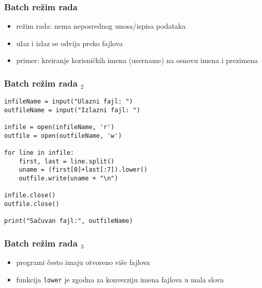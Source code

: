 \documentclass[utf8,compress]{beamer}
\begin{document}
\begin{frame}[fragile]
  \frametitle{Batch režim rada}
  \begin{itemize}
    \item {} režim rada: nema neposrednog unosa/ispisa podataka
    \item ulaz i izlaz se odvija preko fajlova
    \item primer: kreiranje korisničkih imena (username) na osnovu imena i prezimena
  \end{itemize}
\end{frame}

\begin{frame}[fragile]
  \frametitle{Batch režim rada $_2$}
\begin{verbatim}
infileName = input("Ulazni fajl: ")
outfileName = input("Izlazni fajl: ")

infile = open(infileName, 'r')
outfile = open(outfileName, 'w')

for line in infile:
    first, last = line.split()
    uname = (first[0]+last[:7]).lower()
    outfile.write(uname + "\n")

infile.close()
outfile.close()

print("Sačuvan fajl:", outfileName)
\end{verbatim}
\end{frame}

\begin{frame}[fragile]
  \frametitle{Batch režim rada $_3$}
  \begin{itemize}
    \item programi često imaju otvoreno više fajlova
    \item funkcija \texttt{lower} je zgodna za konverziju imena fajlova u mala slova
  \end{itemize}
\end{frame}
\end{document}
